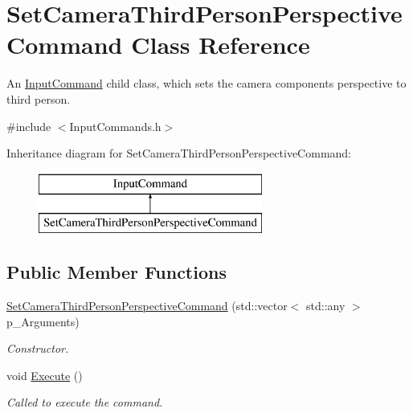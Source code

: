 \hypertarget{class_set_camera_third_person_perspective_command}{}\section{Set\+Camera\+Third\+Person\+Perspective\+Command Class Reference}
\label{class_set_camera_third_person_perspective_command}


An \mbox{\hyperlink{class_input_command}{Input\+Command}} child class, which sets the camera component\textquotesingle{}s perspective to third person.  




{\ttfamily \#include $<$Input\+Commands.\+h$>$}

Inheritance diagram for Set\+Camera\+Third\+Person\+Perspective\+Command\+:\begin{figure}[H]
\begin{center}
\leavevmode
\includegraphics[height=2.000000cm]{class_set_camera_third_person_perspective_command}
\end{center}
\end{figure}
\subsection*{Public Member Functions}
\begin{DoxyCompactItemize}
\item 
\mbox{\hyperlink{class_set_camera_third_person_perspective_command_a630486c044c16140e45c67b3b382912c}{Set\+Camera\+Third\+Person\+Perspective\+Command}} (std\+::vector$<$ std\+::any $>$ p\+\_\+\+Arguments)
\begin{DoxyCompactList}\small\item\em Constructor. \end{DoxyCompactList}\item 
\mbox{\label{class_set_camera_third_person_perspective_command_a7abd59ce317799fec3ec9b9c38233f42}} 
void \mbox{\hyperlink{class_set_camera_third_person_perspective_command_a7abd59ce317799fec3ec9b9c38233f42}{Execute}} ()
\begin{DoxyCompactList}\small\item\em Called to execute the command. \end{DoxyCompactList}\end{DoxyCompactItemize}
